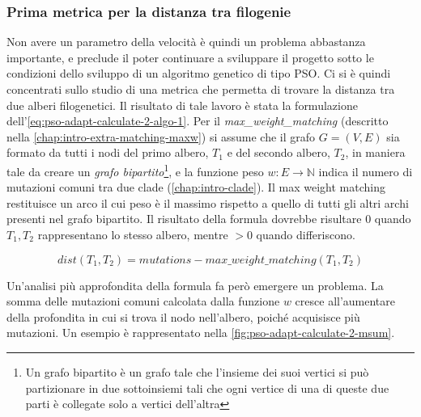 \subsubsection{Prima metrica per la distanza tra filogenie}
\label{chap:pso-adapt-calculate-2}
Non avere un parametro della velocità è quindi un problema abbastanza importante, e preclude il poter continuare a sviluppare il progetto sotto le condizioni dello sviluppo di un algoritmo genetico di tipo PSO.
Ci si è quindi concentrati sullo studio di una metrica che permetta di trovare la distanza tra due alberi filogenetici. Il risultato di tale lavoro è stata la formulazione dell'\autoref{eq:pso-adapt-calculate-2-algo-1}. Per il \textit{max\_weight\_matching} (descritto nella \autoref{chap:intro-extra-matching-maxw}) si assume che il grafo $G = (V, E)$ sia formato da tutti i nodi del primo albero, $T_1$ e del secondo albero, $T_2$, in maniera tale da creare un \textit{grafo bipartito}\footnote{Un grafo bipartito è un grafo tale che l'insieme dei suoi vertici si può partizionare in due sottoinsiemi tali che ogni vertice di una di queste due parti è collegate solo a vertici dell'altra}, e la funzione peso $w: E \rightarrow \mathbb{N}$ indica il numero di mutazioni comuni tra due clade (\autoref{chap:intro-clade}). Il max weight matching restituisce un arco il cui peso è il massimo rispetto a quello di tutti gli altri archi presenti nel grafo bipartito. Il risultato della formula dovrebbe risultare $0$ quando $T_1, T_2$ rappresentano lo stesso albero, mentre $> 0$ quando differiscono.

\begin{equation}
  \label{eq:pso-adapt-calculate-2-algo-1}
  dist(T_1, T_2) = mutations - max\_weight\_matching(T_1, T_2)
\end{equation}

Un'analisi più approfondita della formula fa però emergere  un problema. La somma delle mutazioni comuni calcolata dalla funzione $w$ cresce all'aumentare della profondita in cui si trova il nodo nell'albero, poiché acquisisce più mutazioni. Un esempio è rappresentato nella \autoref{fig:pso-adapt-calculate-2-msum}.

